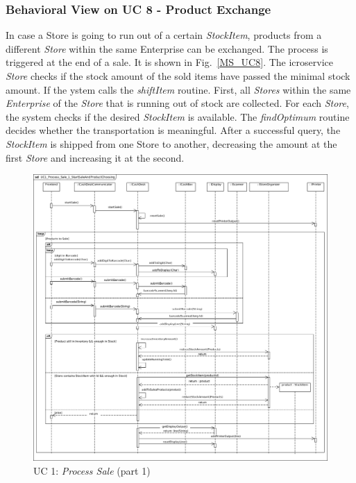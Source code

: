 		\subsubsection*{Behavioral View on UC 8 - Product Exchange}
		In case a Store is going to run out of a certain \textit{StockItem}, products from a different \textit{Store} within the same Enterprise can be exchanged. 
		The process is triggered at the end of a sale. 
		It is shown in  Fig.~\ref{MS_UC8}. 
		The icroservice \textit{Store} checks if the stock amount of the sold items have passed the minimal stock amount. 
		If  the ystem calls the \textit{shiftItem} routine. 
		First, all \textit{Stores} within the same \textit{Enterprise} of the \textit{Store} that is running out of stock are collected.
		For each \textit{Store}, the system checks if the desired \textit{StockItem} is available. 
		The \textit{findOptimum} routine decides whether the transportation is meaningful. 
		After a successful query, the \textit{StockItem} is shipped from one Store to another, decreasing the amount at the first \textit{Store} and increasing it at the second.

		
			\begin{figure}[!h]
				\centering
				\includegraphics[width = 1\textwidth]{img/UC1_Process_Sale_1_StartSaleAndProductChoosing.jpg}
				\caption{UC 1: \textit{Process Sale} (part 1)}
				\label{MS_UC1_1}
			\end{figure}
			
